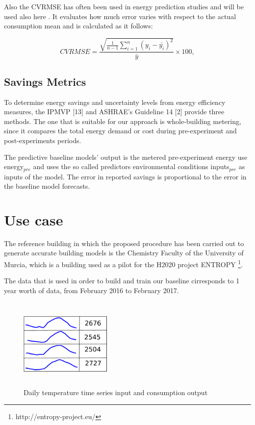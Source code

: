 \documentclass[10pt, conference, compsocconf]{IEEEtran}
\begin{document}
Also the CVRMSE has often been used in energy prediction studies \cite{quilumba2015using} and will be used also here %
. It evaluates how much error varies with respect
to the actual consumption mean and is calculated as it follows:

\[
 CVRMSE = \frac{\sqrt{\frac{1}{n-1}\sum_{i=1}^{n}(y_i-\bar{y_i})^2}}{\bar{y}} \times 100,
\]


\subsection{Savings Metrics}

To determine energy savings and uncertainty levels from energy efficiency measures, the IPMVP [13] and ASHRAE’s Guideline 14 [2] provide three methods. The one that is suitable for our approach is whole-building metering, since it compares the total energy demand or cost during pre-experiment and post-experiments periods.


The predictive baseline models' output is the metered pre-experiment energy use energy$_{pre}$ and uses the so called predictors environmental conditions inputs$_{pre}$ as inputs of the model. The error in reported savings is proportional to the error in the baseline model forecasts.


\section{Use case}

The reference building in which the proposed procedure has been carried out to generate accurate building models is the Chemistry Faculty of the University of Murcia, which is a building used as a pilot for the H2020 project ENTROPY \footnote{http://entropy-project.eu/}.  

The data that is used in order to build and train our baseline cirresponds to 1 year worth of data, from February 2016 to February 2017. 

\begin{figure}[h]%
\centering
\centerline{\includegraphics[width=4.5cm,height=4.5cm,keepaspectratio]{./pics/table_inputs_outputs.pdf}}
\caption{Daily temperature time series input and consumption output}\vspace*{-6pt}
  \label{fig:inout}
\end{figure}
\end{document}
